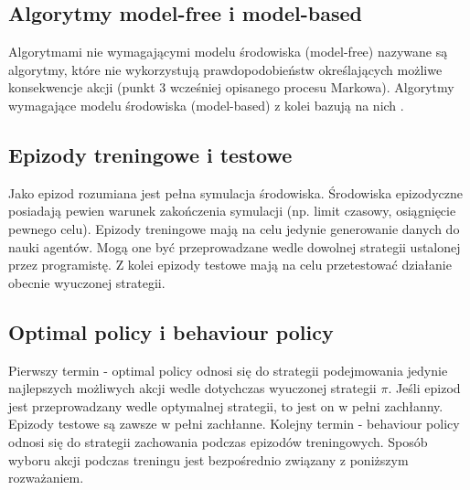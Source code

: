 \documentclass[12pt]{book}
\theoremstyle{plain}
\begin{document}
\subsection*{Algorytmy model-free i model-based}
Algorytmami nie wymagającymi modelu środowiska (model-free) nazywane są algorytmy, które nie wykorzystują prawdopodobieństw określających możliwe konsekwencje akcji (punkt 3 wcześniej opisanego procesu Markowa). Algorytmy wymagające modelu środowiska (model-based) z kolei bazują na nich \cite{reinforcementBook}.
\subsection*{Epizody treningowe i testowe}
Jako epizod rozumiana jest pełna symulacja środowiska. Środowiska epizodyczne posiadają pewien warunek zakończenia symulacji (np. limit czasowy, osiągnięcie pewnego celu). Epizody treningowe mają na celu jedynie generowanie danych do nauki agentów. Mogą one być przeprowadzane wedle dowolnej strategii ustalonej przez programistę. Z kolei epizody testowe mają na celu przetestować działanie obecnie wyuczonej strategii.
\subsection*{Optimal policy i behaviour policy}
Pierwszy termin - optimal policy odnosi się do strategii podejmowania jedynie najlepszych możliwych akcji wedle dotychczas wyuczonej strategii $\pi$. Jeśli epizod jest przeprowadzany wedle optymalnej strategii, to jest on w pełni zachłanny. Epizody testowe są zawsze w pełni zachłanne. Kolejny termin - behaviour policy odnosi się do strategii zachowania podczas epizodów treningowych. Sposób wyboru akcji podczas treningu jest bezpośrednio związany z poniższym rozważaniem.
\end{document}

